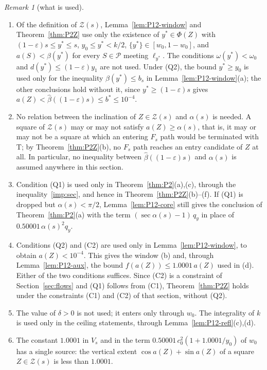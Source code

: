 \documentclass[11pt]{amsart}
\newcommand{\eps}{\varepsilon}
\newcommand{\cP}{\mathcal P}
\newcommand{\cZ}{\mathcal Z}
\newcommand{\Fs}{F_{s}}
\newcommand{\frc}[1]{\{#1\}}
\theoremstyle{definition}
\theoremstyle{remark}
\newtheorem{remark}[theorem]{Remark}
\numberwithin{equation}{section}
\begin{document}
\begin{remark}[what is used]\label{rem:P12-used}
\begin{enumerate}[label=\textup{(\arabic*)}]
\item Of the definition of $\cZ(s)$, Lemma~\ref{lem:P12-window} and Theorem~\ref{thm:P2Z} use only the existence of $y^*\in\Phi(Z)$ with $(1-\eps)s\le y^*\le s$, $y_0\le y^*<k/2$, $\frc{y^*}\in[w_0,1-w_0]$, and $a(S)<\beta(y^*)$ for every $S\in\cP$ meeting $\ell_{y^*}$. The conditions $\omega(y^*)<\omega_0$ and $d(y^*)\le(1-\eps)y_1$ are not used. Under (Q2), the bound $y^*\ge y_0$ is used only for the inequality $\beta(y^*)\le b_s$ in Lemma~\ref{lem:P12-window}(a); the other conclusions hold without it, since $y^*\ge(1-\eps)s$ gives $a(Z)<\hat\beta((1-\eps)s)\le b^*\le10^{-4}$.
\item No relation between the inclination of $Z\in\cZ(s)$ and $\alpha(s)$ is needed. A square of $\cZ(s)$ may or may not satisfy $a(Z)\ge\alpha(s)$, that is, it may or may not be a square at which an entering $\Fs$ path would be terminated with T; by Theorem~\ref{thm:P2Z}(b), no $\Fs$ path reaches an entry candidate of $Z$ at all. In particular, no inequality between $\hat\beta((1-\eps)s)$ and $\alpha(s)$ is assumed anywhere in this section.
\item Condition (Q1) is used only in Theorem~\ref{thm:P2}(a),(c), through the inequality~\eqref{imp:sec}, and hence in Theorem~\ref{thm:P2Z}(b)--(f). If (Q1) is dropped but $\alpha(s)<\pi/2$, Lemma~\ref{lem:P12-core} still gives the conclusion of Theorem~\ref{thm:P2}(a) with the term $(\sec\alpha(s)-1)\,q_y$ in place of $0.50001\,\alpha(s)^2q_y$.
\item Conditions (Q2) and (C2) are used only in Lemma~\ref{lem:P12-window}, to obtain $a(Z)<10^{-4}$. This gives the window (b) and, through Lemma~\ref{lem:P12-aux}, the bound $f(a(Z))\le1.0001\,a(Z)$ used in (d). Either of the two conditions suffices. Since (C2) is a constraint of Section~\ref{sec:flows} and (Q1) follows from (C1), Theorem~\ref{thm:P2Z} holds under the constraints (C1) and (C2) of that section, without (Q2).
\item The value of $\delta>0$ is not used; it enters only through $w_0$. The integrality of $k$ is used only in the ceiling statements, through Lemma~\ref{lem:P12-refl}(c),(d).
\item The constant $1.0001$ in $V_s$ and in the term $0.50001\,c_0^2(1+1.0001/y_0)$ of $w_0$ has a single source: the vertical extent $\cos a(Z)+\sin a(Z)$ of a square $Z\in\cZ(s)$ is less than $1.0001$.
\end{enumerate}
\end{remark}
\end{document}
